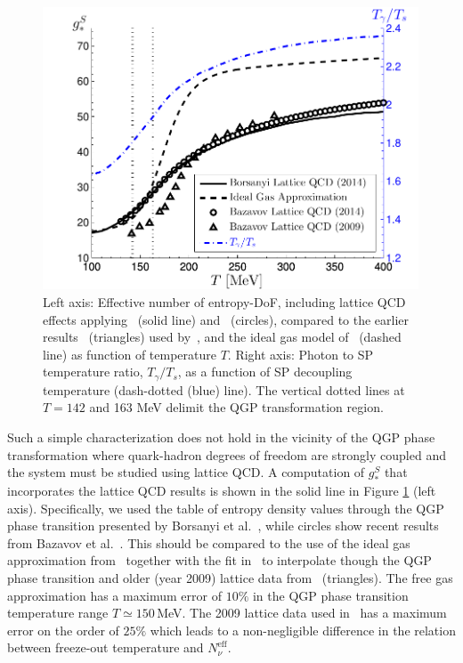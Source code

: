 \begin{figure}\label{fig:gs}
\centering
\begin{minipage}[b]{.49\textwidth}
\centerline{\hspace*{-0.10cm}\includegraphics[height=8.4cm]{04-birrell/ModelIndStudy/Figures/gS_T_ratio.pdf}}
\end{minipage}
\caption{Left axis: Effective number of entropy-DoF, including lattice QCD effects applying~\cite{Borsanyi:2013bia} (solid line) and~\cite{HotQCD:2014kol} (circles), compared to the earlier results~\cite{Bazavov:2009zn} (triangles) used by~\cite{Anchordoqui:2011nh}, and the ideal gas model of~\cite{Coleman:2003hs} (dashed line) as function of temperature $T$. Right axis: Photon to SP temperature ratio, $T_\gamma/T_s$, as a function of SP decoupling temperature (dash-dotted (blue) line). The vertical dotted lines at $T=142$ and 163 MeV delimit the QGP transformation region. \label{fig:gS}}
 \end{figure}

Such a simple characterization does not hold in the vicinity of the QGP phase transformation where  quark-hadron degrees of freedom are strongly coupled  and the system must be studied using lattice QCD. A computation of $g_*^S$ that incorporates the lattice QCD results is shown in the solid line in Figure \ref{fig:gS} (left axis). Specifically, we used the table of entropy density values through the QGP phase transition presented by Borsanyi et al.~\cite{Borsanyi:2013bia}, while circles show recent results from Bazavov et al.~\cite{HotQCD:2014kol}. This should be compared to the use of the ideal gas approximation from~\cite{Coleman:2003hs} together with the fit in~\cite{Wantz:2009it} to interpolate though the QGP phase transition and older (year 2009) lattice data from~\cite{Bazavov:2009zn} (triangles). The free gas approximation has a maximum error of $10\%$ in the QGP phase transition  temperature range  $T\simeq 150$\,MeV.  The 2009 lattice data used in~\cite{Anchordoqui:2011nh} has a maximum error on the order of $25\%$ which leads to a non-negligible difference in the relation between freeze-out temperature and $N^{\text{eff}}_{\nu}$.

